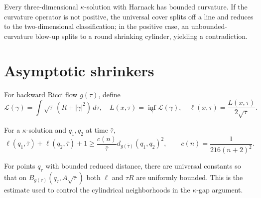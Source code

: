 \begin{proposition}
\label{prop:chow-iii-3d-harnack-equivalence}


Every three-dimensional $\kappa$-solution with Harnack has bounded curvature.
If the curvature operator is not positive, the universal cover splits off a
line and reduces to the two-dimensional classification; in the positive case,
an unbounded-curvature blow-up splits to a round shrinking cylinder, yielding
a contradiction.
\end{proposition}

\section{Asymptotic shrinkers}

\begin{definition}
\label{def:chow-iii-reduced-distance}

For backward Ricci flow $g(\tau)$, define
\[
\mathcal L(\gamma)=\int\sqrt\tau\,(R+|\dot\gamma|^2)\,d\tau,
\quad L(x,\tau)=\inf_\gamma\mathcal L(\gamma),
\quad \ell(x,\tau)=\frac{L(x,\tau)}{2\sqrt\tau}.
\]
\end{definition}

\begin{lemma}
\label{lem:chow-iii-reduced-distance-two-point}


For a $\kappa$-solution and $q_1,q_2$ at time $\bar\tau$,
\[
\ell(q_1,\bar\tau)+\ell(q_2,\bar\tau)+1\ge
\frac{c(n)}{\bar\tau}d_{g(\bar\tau)}(q_1,q_2)^2,
\qquad c(n)=\frac1{216(n+2)^2}.
\]
\end{lemma}

\begin{lemma}
\label{lem:chow-iii-large-neighborhood-estimates}


For points $q_\tau$ with bounded reduced distance, there are universal constants
so that on $B_{g(\tau)}(q_\tau,A\sqrt\tau)$ both $\ell$ and $\tau R$ are
uniformly bounded.  This is the estimate used to control the cylindrical
neighborhoods in the $\kappa$-gap argument.
\end{lemma}

